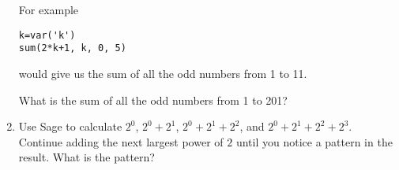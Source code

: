 \begin{enumerate}
	For example

	\begin{codeblock}
\begin{verbatim}
k=var('k')
sum(2*k+1, k, 0, 5)
\end{verbatim}
\end{codeblock}

\noindent would give us the sum of all the odd numbers from 1 to 11.

What is the sum of all the odd numbers from 1 to 201?

\item Use Sage to calculate $2^0$, $2^0+2^1$, $2^0+2^1+2^2$, 
		and $2^0+2^1+2^2+2^3$. Continue adding the next
		largest power of $2$ until you notice a pattern in the
		result. What is the pattern?


\end{enumerate}

